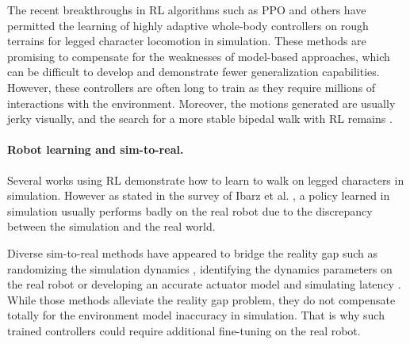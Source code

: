 The recent breakthroughs in RL algorithms such as PPO \cite{PPO_2017} and others \cite{TD3_2018, SAC_2018} have permitted the learning of highly adaptive whole-body controllers on rough terrains for legged character locomotion in simulation.
These methods are promising to compensate for the weaknesses of model-based approaches, which can be difficult to develop and demonstrate fewer generalization capabilities.
However, these controllers are often long to train as they require millions of interactions with the environment. Moreover, the motions generated are usually jerky visually, and the search for a more stable bipedal walk with RL remains \cite{hwangpil_stable_2020}.

\paragraph{Robot learning and sim-to-real.}
Several works using RL demonstrate how to learn to walk on legged characters in simulation.
However as stated in the survey of Ibarz et al. \cite{survey_sergey_robot_rl}, a policy learned in simulation usually performs badly on the real robot due to the discrepancy between the simulation and the real world.

Diverse sim-to-real methods have appeared to bridge the reality gap such as randomizing the simulation dynamics \cite{peng_domain_randomization_2017}, identifying the dynamics parameters on the real robot \cite{liu_sim_to_real_2019} or developing an accurate actuator model and simulating latency \cite{sim_to_real_agile_2018}.
While those methods alleviate the reality gap problem, they do not compensate totally for the environment model inaccuracy in simulation. 
That is why such trained controllers could require additional fine-tuning on the real robot.

